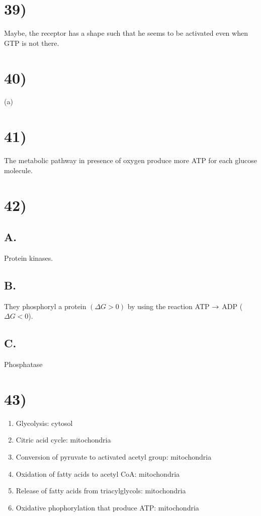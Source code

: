 \section*{39)}
Maybe, the receptor has a shape such that he seems to be activated even when GTP is not there.

\section*{40)}
(a)

\section*{41)}
The metabolic pathway in presence of oxygen produce more ATP for each glucose molecule.

\section*{42)}
\subsection*{A.}
Protein kinases.

\subsection*{B.}
They phosphoryl a protein $(\Delta G > 0)$ by using the reaction ATP $\rightarrow$ ADP ($\Delta G < 0$).

\subsection*{C.}
Phosphatase

\section*{43)}
\begin{enumerate}
    \item Glycolysis: cytosol
    \item Citric acid cycle: mitochondria
    \item Conversion of pyruvate to activated acetyl group: mitochondria
    \item Oxidation of fatty acids to acetyl CoA: mitochondria
    \item Release of fatty acids from triacylglycols: mitochondria
    \item Oxidative phophorylation that produce ATP: mitochondria
\end{enumerate}

